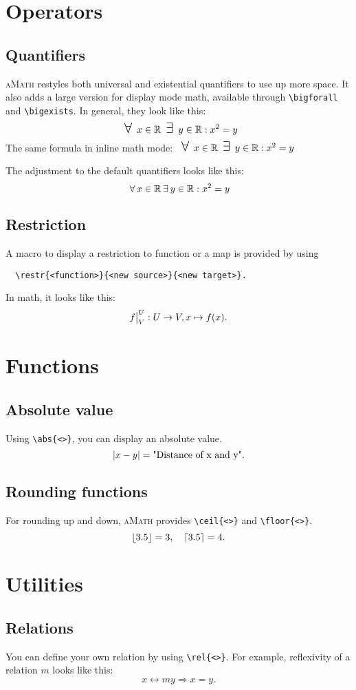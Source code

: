 \documentclass{ctext}
\begin{document}
\section{Operators}
\subsection{Quantifiers}
\textsc{aMath} restyles both universal and existential quantifiers to use up more space. It also adds a large version for display mode math, available through \verb|\bigforall| and \verb|\bigexists|. In general, they look like this:
\[
  \bigforall x \in \R \bigexists y \in \R : x^2 = y
\]
The same formula in inline math mode: \(\bigforall x \in \R \bigexists y \in \R : x^2 = y\)

The adjustment to the default quantifiers looks like this: \[
  \forall x \in \R \exists y \in \R : x^2 = y
\]
\subsection{Restriction}
A macro to display a restriction to function or a map is provided by using
\begin{verbatim}
  \restr{<function>}{<new source>}{<new target>}.
\end{verbatim}
In math, it looks like this:
\[
  \restr{f}{U}{V}: U \rightarrow V, x \mapsto f(x).
\]
\section{Functions}
\subsection{Absolute value}
Using \verb|\abs{<>}|, you can display an absolute value.
\[
  \left\vert x-y\right\vert = \text{"Distance of x and y"}.
\]
\subsection{Rounding functions}
For rounding up and down, \textsc{aMath} provides \verb|\ceil{<>}| and \verb|\floor{<>}|.
\[
  \left\lfloor 3.5 \right \rfloor = 3, \quad \left\lceil 3.5 \right \rceil = 4.
\]
\section{Utilities}
\subsection{Relations}
You can define your own relation by using \verb|\rel{<>}|. For example, reflexivity of a relation \(m\) looks like this:
\[
  x \rel{m} y \Rightarrow x = y.
\]
\end{document}
